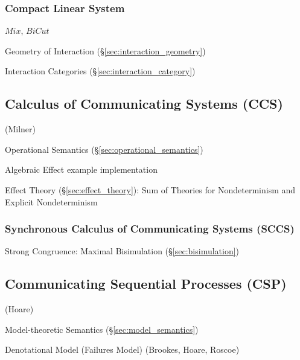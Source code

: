 \subsubsection{Compact Linear System}\label{sec:compact_linear_system}

\cite{abramsky-gay-nagarajan96}

$Mix$, $BiCut$

\cite{wadler12}

Geometry of Interaction (\S\ref{sec:interaction_geometry})

Interaction Categories (\S\ref{sec:interaction_category})



\subsection{Calculus of Communicating Systems (CCS)}\label{sec:ccs}

(Milner)

Operational Semantics (\S\ref{sec:operational_semantics})

Algebraic Effect example implementation \cite{plotkin-pretnar13}

Effect Theory (\S\ref{sec:effect_theory}): Sum of Theories for
Nondeterminism and Explicit Nondeterminism \cite{plotkin-pretnar13}



\subsubsection{Synchronous Calculus of Communicating Systems (SCCS)}
\label{sec:sccs}

Strong Congruence: Maximal Bisimulation (\S\ref{sec:bisimulation})
\cite{aczel88}



\subsection{Communicating Sequential Processes (CSP)}\label{sec:csp}

(Hoare)

Model-theoretic Semantics (\S\ref{sec:model_semantics})

Denotational Model (Failures Model) (Brookes, Hoare, Roscoe)

